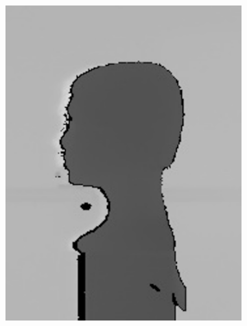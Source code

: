 \begin{figure}[h]
\begin{subfigure}[b]{0.2\textwidth}
		\includegraphics[width=\textwidth]{figures/depth_ir-c.png}
		\caption{}
		\label{fig:depthir:c}
	\end{subfigure}
	\hfill
	\begin{subfigure}[b]{0.2\textwidth}
		\centering

\end{subfigure}
\end{figure}
